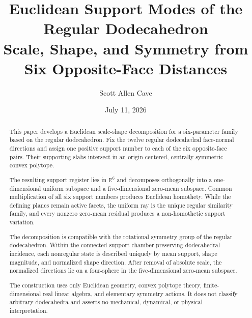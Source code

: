 \documentclass[11pt]{article}
\title{Euclidean Support Modes of the Regular Dodecahedron\\
\large Scale, Shape, and Symmetry from Six Opposite-Face Distances}
\author{Scott Allen Cave}
\date{July 11, 2026}
\theoremstyle{definition}
\theoremstyle{remark}
\begin{document}
\maketitle

\begin{abstract}
This paper develops a Euclidean scale-shape decomposition for a
six-parameter family based on the regular dodecahedron. Fix the twelve
regular dodecahedral face-normal directions and assign one positive support
number to each of the six opposite-face pairs. Their supporting slabs
intersect in an origin-centered, centrally symmetric convex polytope.

The resulting support register lies in \(\mathbb R^6\) and decomposes
orthogonally into a one-dimensional uniform subspace and a
five-dimensional zero-mean subspace. Common multiplication of all six
support numbers produces Euclidean homothety. While the defining planes
remain active facets, the uniform ray is the unique regular similarity
family, and every nonzero zero-mean residual produces a non-homothetic
support variation.

The decomposition is compatible with the rotational symmetry group of the
regular dodecahedron. Within the connected support chamber preserving
dodecahedral incidence, each nonregular state is described uniquely by mean
support, shape magnitude, and normalized shape direction. After removal of
absolute scale, the normalized directions lie on a four-sphere in the
five-dimensional zero-mean subspace.

The construction uses only Euclidean geometry, convex polytope theory,
finite-dimensional real linear algebra, and elementary symmetry actions.
It does not classify arbitrary dodecahedra and asserts no mechanical,
dynamical, or physical interpretation.
\end{abstract}

\tableofcontents









\end{document}
